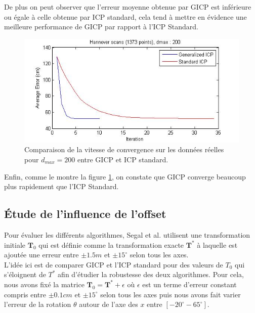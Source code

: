De plus on peut observer que l'erreur moyenne obtenue par GICP est inférieure ou égale à celle obtenue par ICP standard, cela tend à mettre en évidence une meilleure performance de GICP par rapport à l'ICP Standard.\\

\begin{figure}[!h]
     \centering
     \includegraphics[scale=0.4]{Images/Resultats/hannover_dmax200_diffconvergence.jpg}
     \caption{Comparaison de la vitesse de convergence sur les données réelles pour $d_{max}=200$ entre GICP et ICP standard.}
	\label{fig:GICP_convergence}
\end{figure}

Enfin, comme le montre la figure \ref{fig:GICP_convergence}, on constate que GICP converge beaucoup plus rapidement que l'ICP Standard. 
   
\subsection{Étude de l'influence de l'offset}

Pour évaluer les différents algorithmes, Segal et al. utilisent une transformation initiale $\mathbf{T}_0$ qui est définie comme la transformation exacte $\mathbf{T}^*$ à laquelle est ajoutée une erreur entre $\pm1.5m$ et $\pm15^{\circ}$ selon tous les axes. \\

L'idée ici est de comparer GICP et l'ICP standard pour des valeurs de $T_0$ qui s'éloignent de $T^*$ afin d'étudier la robustesse des deux algorithmes. Pour cela, nous avons fixé la matrice $\mathbf{T}_0=\mathbf{T}^*+\epsilon $ où $\epsilon$ est un terme d'erreur constant compris entre $\pm0.1cm$ et $\pm15^{\circ}$ selon tous les axes puis nous avons fait varier l'erreur de la rotation $\theta$ autour de l'axe des $x$ entre $[-20^{\circ} -65^{\circ}]$.\\

